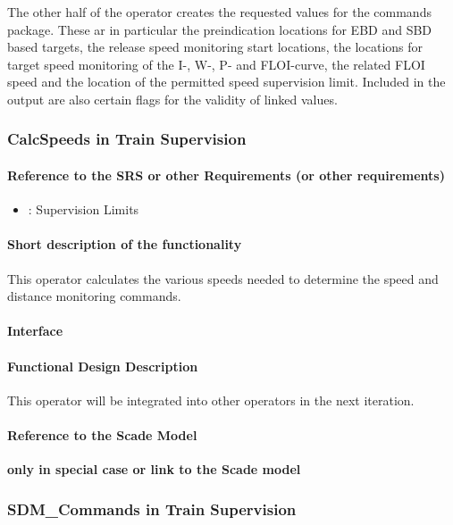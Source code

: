 The other half of the operator creates the requested values for the commands package. These ar in particular the preindication locations for EBD and SBD based targets, the release speed monitoring start locations, the locations for target speed monitoring of the I-, W-, P- and FLOI-curve, the related FLOI speed and the location of the permitted speed supervision limit. Included in the output are also certain flags for the validity of linked values.


\subsubsection{CalcSpeeds in Train Supervision}
\paragraph{Reference to the SRS or other Requirements (or other requirements)}
\begin{itemize}
	\item \cite[Chapt.~3.13.9]{subset-026}: Supervision Limits 
\end{itemize}
\paragraph{Short description of the functionality}
This operator calculates the various speeds needed to determine the speed and distance monitoring commands.
\paragraph{Interface}
\paragraph{Functional Design Description}
This operator will be integrated into other operators in the next iteration.
\paragraph{Reference to the Scade Model}
\textbf{only in special case or link to the Scade model}

\subsubsection{SDM\_Commands in Train Supervision}
